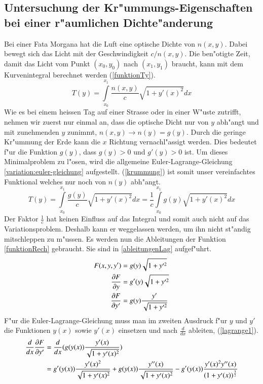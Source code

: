 \subsection{Untersuchung der Kr"ummungs-Eigenschaften bei einer
r"aumlichen Dichte"anderung \label{sec:Krummung}}
Bei einer Fata Morgana hat die Luft eine optische Dichte von $n(x,y)$. 
Dabei bewegt sich das Licht mit der Geschwindigkeit $c/n(x,y)$. 
Die ben"otigte Zeit, damit das Licht vom Punkt $(x_0, y_0)$ nach $(x_1,
y_1)$ braucht,
kann mit dem Kurvenintegral berechnet werden (\eqref{funktionTy}).
\begin{equation}
	T(y) = \int \limits_{x_0}^{x_1} \frac{n(x,y)}{c} \sqrt{1 + y'(x)^2} dx
	\label{funktionTy}
\end{equation}
Wie es bei einem heissen Tag auf einer Strasse oder in einer W"uste zutrifft,
nehmen wir zuerst nur einmal an, dass die optische Dicht nur von $y$
abh"angt und mit zunehmenden $y$ zunimmt,
$n(x,y) \rightarrow n(y)=g(y)$.
Durch die geringe Kr"ummung der Erde kann die $x$ Richtung vernachl"assigt
werden.
Dies bedeutet f"ur die Funktion $g(y)$, dass $g(y) > 0$ und $g'(y) > 0 $ ist.
Um dieses Minimalproblem zu l"osen, wird die allgemeine
Euler-Lagrange-Gleichung 
\eqref{variation:euler-gleichung}  aufgestellt. (\eqref{krummung})
ist somit unser vereinfachtes Funktional welches nur noch von $n(y)$
abh"angt.
\begin{equation}
	T(y) = \int \limits_{x_0}^{x_1} \frac{g(y)}{c} \sqrt{1 + y'(x)^2} dx = \frac{1}{c} \int \limits_{x_0}^{x_1} g(y) \sqrt{1 + y'(x)^2} dx
	\label{krummung}
\end{equation}
Der Faktor $\frac{1}{c}$ hat keinen Einfluss auf das Integral und somit
auch nicht auf das Variationsproblem. Deshalb kann er weggelassen werden,
um ihn nicht st"andig mitschleppen zu m"ussen.
Es werden nun die Ableitungen der Funktion \ref{funktionRech}
gebraucht. Sie sind in \ref{ableitungenLag} aufgef"uhrt.
\begin{align}
	F(x,y,y') &= g(y) \sqrt{1 + y'^2} \label{funktionRech} \\
	\frac{\partial F}{\partial y} &= g'(y) \sqrt{1 + y'^2} \notag \\
	\frac{\partial F}{\partial y'} &= g(y) \frac{y'}{\sqrt{1 + y'^2}} \label{ableitungenLag}
\end{align}
F"ur die Euler-Lagrange-Gleichung muss man im zweiten Ausdruck f"ur $y$
und $y'$ die Funktionen $y(x)$ 
sowie $y'(x)$ einsetzen und nach $\frac{d}{dx}$ ableiten, (\eqref{lagrange1}).
\begin{align}
	\frac{d}{dx} \frac{\partial F}{\partial y'} &= \frac{d}{dx} (g(y(x)) \frac{y'(x)}{\sqrt{1 + y'(x)^2}}) \notag \\ 
	&= g'(y(x)) \frac{y'(x)^2}{\sqrt{1 + y'(x)^2}} + g(y(x)) \frac{y''(x)}{\sqrt{1 + y'(x)^2}}
	 - g'(y(x)) \frac{y'(x)^2 y''(x)}{(1 + y'(x))^\frac{3}{2}} 
	 \label{lagrange1}
\end{align}
